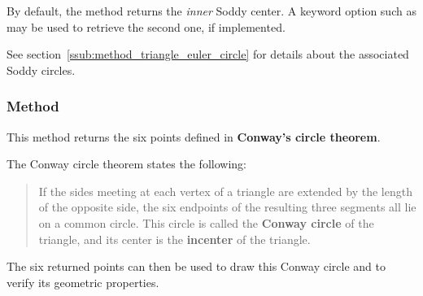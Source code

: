 \medskip
\noindent
By default, the method returns the \emph{inner} Soddy center. A keyword option such as  may be used to retrieve the second one, if implemented.

\medskip
\noindent
See  section~\ref{ssub:method_triangle_euler_circle} for details about the associated Soddy circles.

\vspace{1em}

\vspace{1em}
\begin{minipage}{.5\textwidth}
\end{minipage}
\begin{minipage}{.5\textwidth}
\begin{tkzexample}
\end{tkzexample}
\end{minipage}

\subsubsection{Method }
\label{ssub:method_triangle_conway_points}

This method returns the six points defined in \textbf{Conway’s circle theorem}.

\medskip
\noindent
The Conway circle theorem states the following:

\begin{quote}
If the sides meeting at each vertex of a triangle are extended by the length of the opposite side, the six endpoints of the resulting three segments all lie on a common circle. This circle is called the \textbf{Conway circle} of the triangle, and its center is the \textbf{incenter} of the triangle.
\end{quote}

\medskip
\noindent
The six returned points can then be used to draw this Conway circle and to verify its geometric properties.

